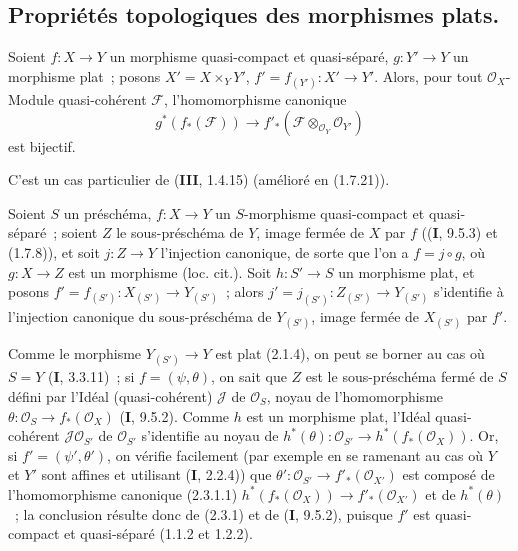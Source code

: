 \subsection{Propriétés topologiques des morphismes plats.}
\label{subsection:IV.2.3-fr}

\begin{lemma}[2.3.1]
Soient $f:X\to Y$ un morphisme quasi-compact et quasi-séparé,
$g:Y'\to Y$ un morphisme plat~; posons $X'=X\times_Y Y'$,
$f'=f_{(Y')}:X'\to Y'$. Alors, pour tout $\mathcal O_X$-Module quasi-cohérent
$\mathscr F$, l'homomorphisme canonique
\begin{equation}
\tag{2.3.1.1}
\label{IV.2.3.1.1-fr}
  g^*(f_*(\mathscr F))\to
  f'_*(\mathscr F\otimes_{\mathcal O_Y}\mathcal O_{Y'})
\end{equation}
est bijectif.
\end{lemma}

C'est un cas particulier de (\textbf{III}, 1.4.15) (amélioré en (1.7.21)).

\begin{proposition}[2.3.2]
\label{IV.2.3.2-fr}
Soient $S$ un préschéma, $f:X\to Y$ un $S$-morphisme quasi-compact et
quasi-séparé~; soient $Z$ le sous-préschéma de $Y$, image fermée de $X$ par
$f$ \textup{((\textbf{I}, 9.5.3)} et \textup{(1.7.8))}, et soit $j:Z\to Y$ l'injection canonique, de
sorte que l'on a $f=j\circ g$, où $g:X\to Z$ est un morphisme
(loc. cit.). Soit $h:S'\to S$ un morphisme plat, et posons
$f'=f_{(S')}:X_{(S')}\to Y_{(S')}$~; alors
$j'=j_{(S')}:Z_{(S')}\to Y_{(S')}$ s'identifie à l'injection canonique du
sous-préschéma de $Y_{(S')}$, image fermée de $X_{(S')}$ par $f'$.
\end{proposition}

Comme le morphisme $Y_{(S')}\to Y$ est plat (2.1.4), on peut se borner au cas
où $S=Y$ (\textbf{I}, 3.3.11)~; si $f=(\psi,\theta)$, on sait que $Z$ est le
sous-préschéma fermé de $S$ défini par l'Idéal (quasi-cohérent) $\mathscr J$
de $\mathcal O_S$, noyau de l'homomorphisme
$\theta:\mathcal O_S\to f_*(\mathcal O_X)$ (\textbf{I}, 9.5.2). Comme $h$ est un
morphisme plat, l'Idéal quasi-cohérent $\mathscr J\mathcal O_{S'}$ de
$\mathcal O_{S'}$ s'identifie au noyau de
$h^*(\theta):\mathcal O_{S'}\to h^*(f_*(\mathcal O_X))$. Or, si
$f'=(\psi',\theta')$, on vérifie facilement (par exemple en se ramenant au
cas où $Y$ et $Y'$ sont affines et utilisant (\textbf{I}, 2.2.4)) que
$\theta':\mathcal O_{S'}\to f'_*(\mathcal O_{X'})$ est composé de
l'homomorphisme canonique (2.3.1.1)
$h^*(f_*(\mathcal O_X))\to f'_*(\mathcal O_{X'})$ et de $h^*(\theta)$~; la
conclusion résulte donc de (2.3.1) et de (\textbf{I}, 9.5.2), puisque $f'$ est
quasi-compact et quasi-séparé (1.1.2 et 1.2.2).

